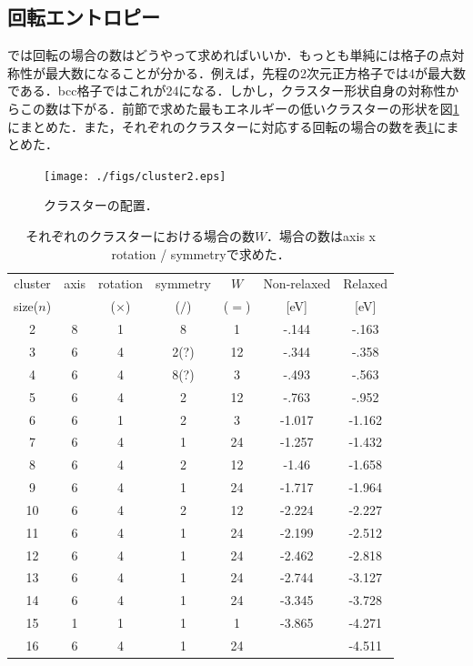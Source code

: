 \documentclass[a4j,10pt]{jarticle}
\begin{document}
\subsection{回転エントロピー}
では回転の場合の数はどうやって求めればいいか．もっとも単純には格子の点対称性が最大数になることが分かる．例えば，先程の2次元正方格子では4が最大数である．bcc格子ではこれが24になる．しかし，クラスター形状自身の対称性からこの数は下がる．前節で求めた最もエネルギーの低いクラスターの形状を図\ref{ClusterConfig}にまとめた．また，それぞれのクラスターに対応する回転の場合の数を表\ref{Table:rotation}にまとめた．
\begin{figure}\begin{center}
\texttt{[image: ./figs/cluster2.eps]}
\caption{クラスターの配置．}
\label{ClusterConfig}
\end{center}\end{figure}

\begin{table}
\begin{center}
\caption[]{それぞれのクラスターにおける場合の数$W$．場合の数はaxis x rotation / symmetryで求めた．}
\label{Table:rotation}
\begin{tabular}{ccccccc}
\hline
cluster&axis&rotation&symmetry&$W$&Non-relaxed&Relaxed\\
 size($n$)&& ($\times$) & ($/$) & ($=$) &[eV]&[eV]\\ \hline
2&8&1&8&1&  -.144 &  -.163 \\
3&6&4&2(?)&12&  -.344 &  -.358 \\
4&6&4&8(?)&3&  -.493 &  -.563 \\
5&6&4&2&12&  -.763 &  -.952 \\
6&6&1&2&3& -1.017 & -1.162 \\
7&6&4&1&24& -1.257 & -1.432 \\
8&6&4&2&12& -1.46  & -1.658 \\
9&6&4&1&24& -1.717 & -1.964 \\
10&6&4&2&12& -2.224 & -2.227 \\
11&6&4&1&24& -2.199 & -2.512 \\
12&6&4&1&24& -2.462 & -2.818 \\
13&6&4&1&24& -2.744 & -3.127 \\
14&6&4&1&24& -3.345 & -3.728 \\
15&1&1&1&1& -3.865 & -4.271 \\
16&6&4&1&24&    & -4.511 \\
\hline
\end{tabular}
\end{center}
\end{table}%
\end{document}
